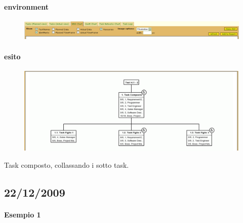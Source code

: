 \paragraph{environment}
\begin{figure}
\centering
\includegraphics[width=\textwidth]{tests/TEST_WBS/4.1/4.1_2/Esempio_2/environment.png}
\end{figure}
\paragraph{esito}
\begin{figure}
\centering
\includegraphics[width=\textwidth]{tests/TEST_WBS/4.1/4.1_2/Esempio_2/output.png}
\end{figure}

Task composto, collassando i sotto task.

\subsection{22/12/2009}
\paragraph{Esempio 1}
